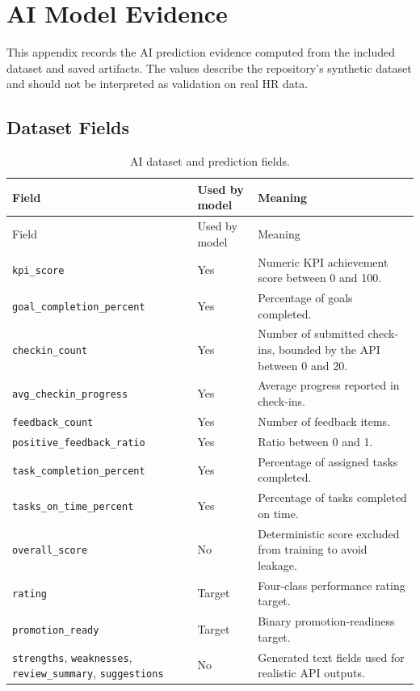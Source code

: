 \chapter{AI Model Evidence}
This appendix records the AI prediction evidence computed from the included dataset and saved artifacts. The values describe the repository's synthetic dataset and should not be interpreted as validation on real HR data.

\section{Dataset Fields}
\begin{longtable}{p{}p{}p{}}
\caption{AI dataset and prediction fields.}\label{tab:ai-fields}\\
\toprule
Field & Used by model & Meaning\\
\midrule
\endfirsthead
\toprule
Field & Used by model & Meaning\\
\midrule
\endhead
\texttt{kpi\_score} & Yes & Numeric KPI achievement score between 0 and 100.\\
\texttt{goal\_completion\_percent} & Yes & Percentage of goals completed.\\
\texttt{checkin\_count} & Yes & Number of submitted check-ins, bounded by the API between 0 and 20.\\
\texttt{avg\_checkin\_progress} & Yes & Average progress reported in check-ins.\\
\texttt{feedback\_count} & Yes & Number of feedback items.\\
\texttt{positive\_feedback\_ratio} & Yes & Ratio between 0 and 1.\\
\texttt{task\_completion\_percent} & Yes & Percentage of assigned tasks completed.\\
\texttt{tasks\_on\_time\_percent} & Yes & Percentage of tasks completed on time.\\
\texttt{overall\_score} & No & Deterministic score excluded from training to avoid leakage.\\
\texttt{rating} & Target & Four-class performance rating target.\\
\texttt{promotion\_ready} & Target & Binary promotion-readiness target.\\
\texttt{strengths}, \texttt{weaknesses}, \texttt{review\_summary}, \texttt{suggestions} & No & Generated text fields used for realistic API outputs.\\
\bottomrule
\end{longtable}

